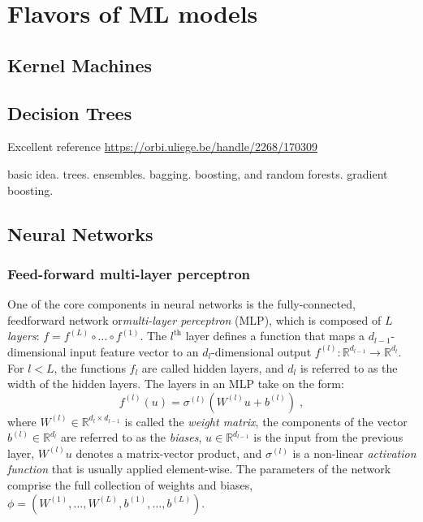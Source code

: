 
\section{Flavors of ML models}\label{ML:sec:supervised}
\subsection{Kernel Machines}\label{ML:sec:kernel_machines}



\subsection{Decision Trees}\label{ML:sec:decision_trees}
Excellent reference \url{https://orbi.uliege.be/handle/2268/170309}\cite{louppe2014understanding}

basic idea. 
trees. ensembles. bagging. boosting, and random forests.  gradient boosting. 

\subsection{Neural Networks}\label{ML:sec:nn}
\subsubsection{Feed-forward multi-layer perceptron}\label{ML:sec:mlp}

One of the core components in neural networks is the fully-connected, feedforward network or\textit{multi-layer perceptron} (MLP), which is composed of $L$ \textit{layers}: $f = f^{(L)} \circ \dots \circ f^{(1)}$. The $l^\textrm{th}$ layer defines a function that maps a $d_{l-1}$-dimensional input feature vector to an $d_{l}$-dimensional output $f^{(l)}: \mathbb{R}^{d_{l-1}} \to \mathbb{R}^{d_{l}}$.  For $l<L$, the functions $f_l$ are called hidden layers, and $d_{l}$ is referred to as the width of the hidden layers. The layers in an MLP take on the form:
\begin{equation}
    \label{ML:eq:hiden_layer}
    f^{(l)}(u) = \sigma^{(l)}( W^{(l)} u + b^{(l)} ) \;,
\end{equation}
where $W^{(l)} \in \mathbb{R}^{d_{l} \times d_{l-1}}$ is called the \textit{weight matrix}, the components of the vector $b^{(l)} \in \mathbb{R}^{d_{l}}$ are referred to as the \textit{biases}, $u \in \mathbb{R}^{d_{l-1}}$ is the input from the previous layer, $W^{(l)} u$ denotes a matrix-vector product, and $\sigma^{(l)}$ is a non-linear \textit{activation function} that is usually applied element-wise. The parameters of the network comprise the full collection of weights and biases, $\phi = (W^{(1)}, \dots, W^{(L)}, b^{(1)}, \dots, b^{(L)})$. 

